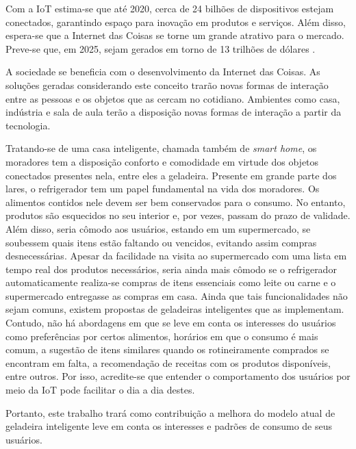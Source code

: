 Com a IoT estima-se que até 2020, cerca de 24 bilhões de dispositivos estejam conectados, garantindo espaço para inovação em produtos e serviços. Além disso, espera-se que a Internet das Coisas se torne um grande atrativo para o mercado. Preve-se que, em 2025, sejam gerados em torno de 13 trilhões de dólares \cite{Meola2016}.

A sociedade se beneficia com o desenvolvimento da Internet das Coisas. As soluções geradas considerando este conceito trarão novas formas de interação entre as pessoas e os objetos que as cercam no cotidiano. Ambientes como casa, indústria e sala de aula terão a disposição novas formas de interação a partir da tecnologia. 

Tratando-se de uma casa inteligente, chamada também de \textit{smart home}, os moradores tem a disposição conforto e comodidade em virtude dos objetos conectados presentes nela, entre eles a geladeira. Presente em grande parte dos lares, o refrigerador tem um papel fundamental na vida dos moradores. Os alimentos contidos nele devem ser bem conservados para o consumo. No entanto, produtos são esquecidos no seu interior e, por vezes, passam do prazo de validade. Além disso, seria cômodo aos usuários, estando em um supermercado, se soubessem quais itens estão faltando ou vencidos, evitando assim compras desnecessárias. Apesar da facilidade na visita ao supermercado com uma lista em tempo real dos produtos necessários, seria ainda mais cômodo se o refrigerador automaticamente realiza-se compras de itens essenciais como leite ou carne e o supermercado entregasse as compras em casa. Ainda que tais funcionalidades não sejam comuns, existem propostas de geladeiras inteligentes que as implementam. Contudo, não há abordagens em que se leve em conta os interesses do usuários como preferências por certos alimentos, horários em que o consumo é mais comum, a sugestão de itens similares quando os rotineiramente comprados se encontram em falta, a recomendação de receitas com os produtos disponíveis, entre outros. Por isso, acredite-se que entender o comportamento dos usuários por meio da IoT pode facilitar o dia a dia destes.

Portanto, este trabalho trará como contribuição a melhora do modelo atual de geladeira inteligente leve em conta os interesses e padrões de consumo de seus usuários.



